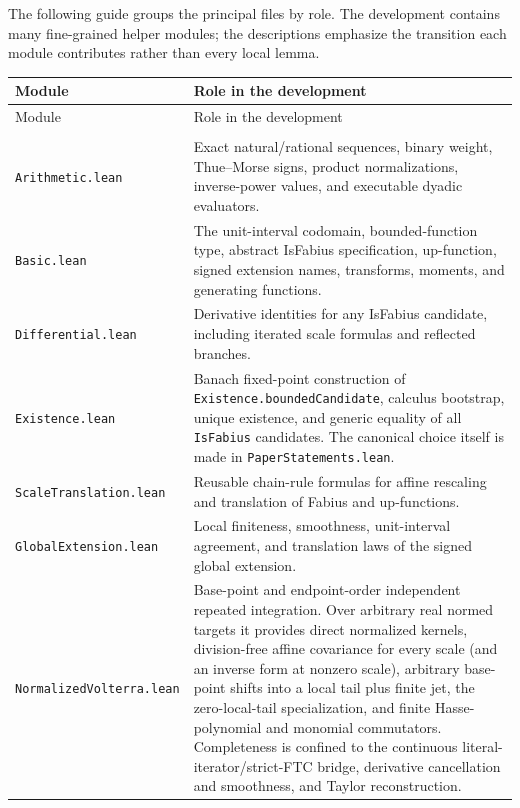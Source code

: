 \documentclass[11pt,oneside]{article}
\theoremstyle{definition}
\theoremstyle{remark}
\begin{document}
The following guide groups the principal files by role.  The development contains many fine-grained helper modules; the descriptions emphasize the transition each module contributes rather than every local lemma.

\begin{longtable}{>{\raggedright\arraybackslash}p{} >{\raggedright\arraybackslash}p{}}
\toprule
Module & Role in the development \\
\midrule
\endfirsthead
\toprule
Module & Role in the development \\
\midrule
\endhead
\multicolumn{2}{l}{\textbf{Core interfaces and construction}}\\[0.25em]
\nolinkurl{Arithmetic.lean} & Exact natural/rational sequences, binary weight, Thue--Morse signs, product normalizations, inverse-power values, and executable dyadic evaluators. \\
\nolinkurl{Basic.lean} & The unit-interval codomain, bounded-function type, abstract IsFabius specification, up-function, signed extension names, transforms, moments, and generating functions. \\
\nolinkurl{Differential.lean} & Derivative identities for any IsFabius candidate, including iterated scale formulas and reflected branches. \\
\nolinkurl{Existence.lean} & Banach fixed-point construction of \nolinkurl{Existence.boundedCandidate}, calculus bootstrap, unique existence, and generic equality of all \nolinkurl{IsFabius} candidates.  The canonical choice itself is made in \nolinkurl{PaperStatements.lean}. \\
\nolinkurl{ScaleTranslation.lean} & Reusable chain-rule formulas for affine rescaling and translation of Fabius and up-functions. \\
\nolinkurl{GlobalExtension.lean} & Local finiteness, smoothness, unit-interval agreement, and translation laws of the signed global extension. \\
\nolinkurl{NormalizedVolterra.lean} & Base-point and endpoint-order independent repeated integration.  Over arbitrary real normed targets it provides direct normalized kernels, division-free affine covariance for every scale (and an inverse form at nonzero scale), arbitrary base-point shifts into a local tail plus finite jet, the zero-local-tail specialization, and finite Hasse-polynomial and monomial commutators.  Completeness is confined to the continuous literal-iterator/strict-FTC bridge, derivative cancellation and smoothness, and Taylor reconstruction. \\

\end{longtable}
\end{document}
